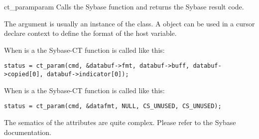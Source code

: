 \begin{methoddesc}[CS_COMMAND]{ct_param}{param}
Calls the Sybase  function and returns the Sybase
result code.

The  argument is usually an instance of the 
class.  A  object can be used in a cursor declare
context to define the format of the host variable.

When  is a  the Sybase-CT
 function is called like this:

\begin{verbatim}
status = ct_param(cmd, &databuf->fmt, databuf->buff, databuf->copied[0], databuf->indicator[0]);
\end{verbatim}

When  is a  the Sybase-CT
 function is called like this:

\begin{verbatim}
status = ct_param(cmd, &datafmt, NULL, CS_UNUSED, CS_UNUSED);
\end{verbatim}

The sematics of the  attributes are quite complex.
Please refer to the Sybase documentation.
\end{methoddesc}

